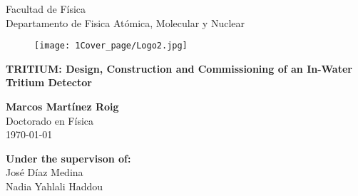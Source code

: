 \begin{titlepage}

\begin{center}


{\large Facultad de Física}\\
{\large Departamento de Fisica Atómica, Molecular y Nuclear}\\
\vspace*{0.2in}
\vspace*{0.6in}
\end{center}
\vspace*{-1in}
\begin{center}
\vspace*{1 cm}


\begin{figure}[htb]
\begin{center}
\texttt{[image: 1Cover\_page/Logo2.jpg]} 
\end{center}
\end{figure}
\vspace*{1 cm}

\begin{large}

\end{large}
\begin{Large}
\textbf{\LARGE TRITIUM: Design, Construction and Commissioning of an In-Water Tritium Detector} \\
\end{Large}
\vspace*{1.2 cm}

\begin{large}
\textbf{Marcos Martínez Roig}\\
Doctorado en Física\\
\today
\end{large}
\end{center}

\vspace*{-1.2 cm}
\begin{flushright}
\item[\bf Under the supervison of:]\quad  \\ 
José Díaz Medina\\
Nadia Yahlali Haddou\\
\end{flushright}

\end{titlepage}
